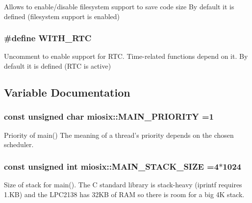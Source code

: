 Allows to enable/disable filesystem support to save code size By default it is defined (filesystem support is enabled) \hypertarget{group___settings_ga1e2c27233bcd524c01ea5fcb45a002ab}{
\subsubsection[{W\-I\-T\-H\-\_\-\-R\-T\-C}]{\setlength{\rightskip}{0pt plus 5cm}\#define W\-I\-T\-H\-\_\-\-R\-T\-C}}\label{group___settings_ga1e2c27233bcd524c01ea5fcb45a002ab}
Uncomment to enable support for R\-T\-C. Time-\/related functions depend on it. By default it is defined (R\-T\-C is active) 

\subsection{Variable Documentation}
\hypertarget{group___settings_gad66abb7a060d94617390e1838e4e3b01}{
\subsubsection[{M\-A\-I\-N\-\_\-\-P\-R\-I\-O\-R\-I\-T\-Y}]{\setlength{\rightskip}{0pt plus 5cm}const unsigned char miosix\-::\-M\-A\-I\-N\-\_\-\-P\-R\-I\-O\-R\-I\-T\-Y =1}}\label{group___settings_gad66abb7a060d94617390e1838e4e3b01}
Priority of main() The meaning of a thread's priority depends on the chosen scheduler. \hypertarget{group___settings_ga78af1ac6f48bb21cdd8a6e51b26899a3}{
\subsubsection[{M\-A\-I\-N\-\_\-\-S\-T\-A\-C\-K\-\_\-\-S\-I\-Z\-E}]{\setlength{\rightskip}{0pt plus 5cm}const unsigned int miosix\-::\-M\-A\-I\-N\-\_\-\-S\-T\-A\-C\-K\-\_\-\-S\-I\-Z\-E =4$\ast$1024}}\label{group___settings_ga78af1ac6f48bb21cdd8a6e51b26899a3}
Size of stack for main(). The C standard library is stack-\/heavy (iprintf requires 1.\-K\-B) and the L\-P\-C2138 has 32\-K\-B of R\-A\-M so there is room for a big 4\-K stack.

